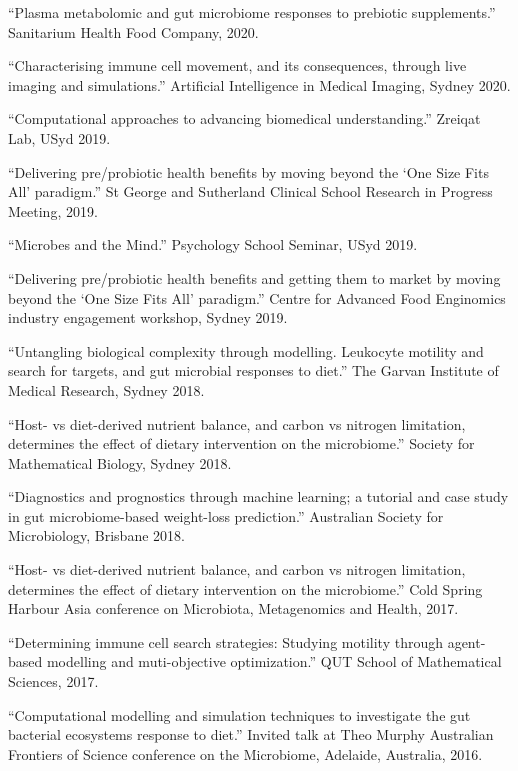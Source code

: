 \documentclass[a4paper]{article}
\begin{document}
``Plasma metabolomic and gut microbiome responses to prebiotic supplements.'' Sanitarium Health Food Company, 2020.

``Characterising immune cell movement, and its consequences, through live imaging and simulations.'' Artificial Intelligence in Medical Imaging, Sydney 2020.

``Computational approaches to advancing biomedical understanding.'' Zreiqat Lab, USyd 2019.

``Delivering pre/probiotic health benefits by moving beyond the `One Size Fits All' paradigm.'' St George and Sutherland Clinical School Research in Progress Meeting, 2019.

``Microbes and the Mind.'' Psychology School Seminar, USyd 2019.

``Delivering pre/probiotic health benefits and getting them to market by moving beyond the `One Size Fits All' paradigm.'' Centre for Advanced Food Enginomics industry engagement workshop, Sydney 2019.

``Untangling biological complexity through modelling. Leukocyte motility and search for targets, and gut
microbial responses to diet.'' The Garvan Institute of Medical Research, Sydney 2018.

``Host- vs diet-derived nutrient balance, and carbon vs nitrogen limitation, determines the effect of dietary intervention on the microbiome.'' Society for Mathematical Biology, Sydney 2018.

``Diagnostics and prognostics through machine learning; a tutorial and case study in gut microbiome-based weight-loss prediction.'' Australian Society for Microbiology, Brisbane 2018.


``Host- vs diet-derived nutrient balance, and carbon vs nitrogen limitation, determines the effect of dietary intervention on the microbiome.'' Cold Spring Harbour Asia conference on Microbiota, Metagenomics and Health, 2017.

``Determining immune cell search strategies: Studying motility through agent-based modelling and muti-objective optimization.'' QUT School of Mathematical Sciences, 2017.

``Computational modelling and simulation techniques to investigate the gut bacterial ecosystems response to diet.'' Invited talk at Theo Murphy Australian Frontiers of Science conference on the Microbiome, Adelaide, Australia, 2016.
\end{document}
